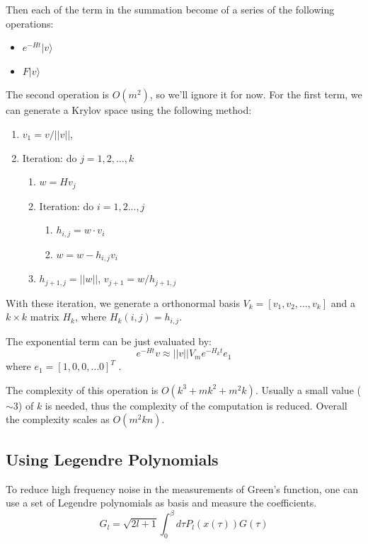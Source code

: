 Then each of the term in the summation become of a series of the following 
operations:
\begin{itemize}
\item $e^{-Ht}|v\rangle$
\item $F|v\rangle$
\end{itemize}

The second operation is $O(m^2)$, so we'll ignore it for now. For the first term,
we can generate a Krylov space using the following method: 
\begin{enumerate}
\item $v_1=v/||v||$,
\item Iteration: do $j=1,2,\ldots,k$ 
  \begin{enumerate}
  \item $w=Hv_j$
  \item Iteration: do $i=1,2...,j$
    \begin{enumerate}
    \item $h_{i,j}=w\cdot v_i$
    \item $w=w-h_{i,j}v_i$
    \end{enumerate}
  \item  $h_{j+1,j}=||w||$, $v_{j+1}=w/h_{j+1,j}$
  \end{enumerate}

\end{enumerate}

With these iteration, we generate a orthonormal basis 
$V_k=[v_1,v_2,\ldots, v_k]$
and a $k\times k$ matrix $H_k$, where $H_k(i,j)=h_{i,j}$.

The exponential term can be just evaluated by:
\[
e^{-Ht}v \approx ||v|| V_m e^{-H_k t}e_1
\]
where $e_1 = [1, 0, 0, \ldots 0]^T$ . 

The complexity of this operation is $O(k^3+mk^2+m^2k)$. Usually a small value ($\sim 3$)
of $k$ is needed, thus the complexity of the computation is reduced. 
Overall the complexity scales as $O(m^2kn)$.


\subsection{Using Legendre Polynomials}

To reduce high frequency noise in the measurements of Green's function, 
one can use a set of Legendre polynomials as basis and measure the coefficients. 
\[
G_l=\sqrt{2l+1}\int_0^\beta d\tau P_l(x(\tau))G(\tau)
\]

